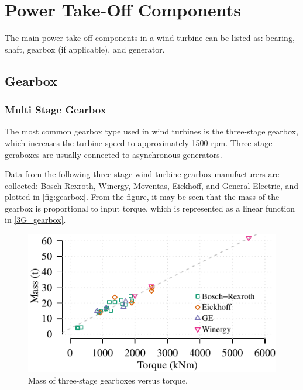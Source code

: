 \documentclass{article}\usepackage{graphicx, color}
\makeatletter
\def\maxwidth{ %
  \ifdim\Gin@nat@width>\linewidth
    \linewidth
  \else
    \Gin@nat@width
  \fi
}
\newenvironment{knitrout}{}{} %
\makeatother
\begin{document}
\section{Power Take-Off Components}

The main power take-off components in a wind turbine can be listed as: bearing, shaft, gearbox (if applicable), and generator. 

\subsection{Gearbox}

\subsubsection{Multi Stage Gearbox}

The most common gearbox type used in wind turbines is the three-stage gearbox, which increases the turbine speed to approximately 1500 rpm. Three-stage geraboxes are usually connected to asynchronous generators. 

Data from the following three-stage wind turbine gearbox manufacturers are collected: Bosch-Rexroth\cite{bosch}, Winergy\cite{winergy}, Moventas\cite{Moventas}, Eickhoff\cite{eickhoff}, and General Electric\cite{GE}, and plotted in \autoref{fig:gearbox}. From the figure, it may be seen that the mass of the gearbox is proportional to input torque, which is represented as a linear function in \autoref{3G_gearbox}. 

\begin{knitrout}
\color{fgcolor}\begin{figure}[]

\includegraphics[width=\maxwidth]{figure/gearbox} \caption[Mass of three-stage gearboxes versus torque]{Mass of three-stage gearboxes versus torque.\label{fig:gearbox}}
\end{figure}


\end{knitrout}
\end{document}
